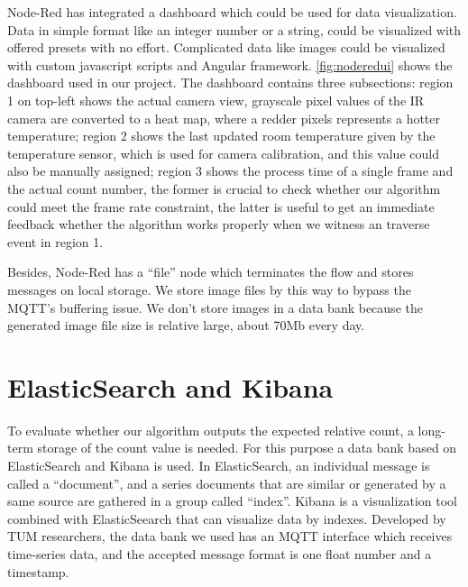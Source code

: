 Node-Red has integrated a dashboard which could be used for data visualization. Data in simple format like an integer number or a string, could be visualized with offered presets with no effort. Complicated data like images could be visualized with custom javascript scripts and Angular framework. \autoref{fig:noderedui} shows the dashboard used in our project. The dashboard contains three subsections: region 1 on top-left shows the actual camera view, grayscale pixel values of the IR camera are converted to a heat map, where a redder pixels represents a hotter temperature; region 2 shows the last updated room temperature given by the temperature sensor, which is used for camera calibration, and this value could also be manually assigned; region 3 shows the process time of a single frame and the actual count number, the former is crucial to check whether our algorithm could meet the frame rate constraint, the latter is useful to get an immediate feedback whether the algorithm works properly when we witness an traverse event in region 1.

Besides, Node-Red has a ``file'' node which terminates the flow and stores messages on local storage. We store image files by this way to bypass the MQTT's buffering issue. We don't store images in a data bank because the generated image file size is relative large, about 70Mb every day.
%
\section{ElasticSearch and Kibana}
To evaluate whether our algorithm outputs the expected relative count, a long-term storage of the count value is needed. For this purpose a data bank based on ElasticSearch and Kibana is used. In ElasticSearch, an individual message is called a ``document'', and a series documents that are similar or generated by a same source are gathered in a group called ``index''. Kibana is a visualization tool combined with ElasticSeearch that can visualize data by indexes. Developed by TUM researchers, the data bank we used has an MQTT interface which receives time-series data, and the accepted message format is one float number and a timestamp. 

